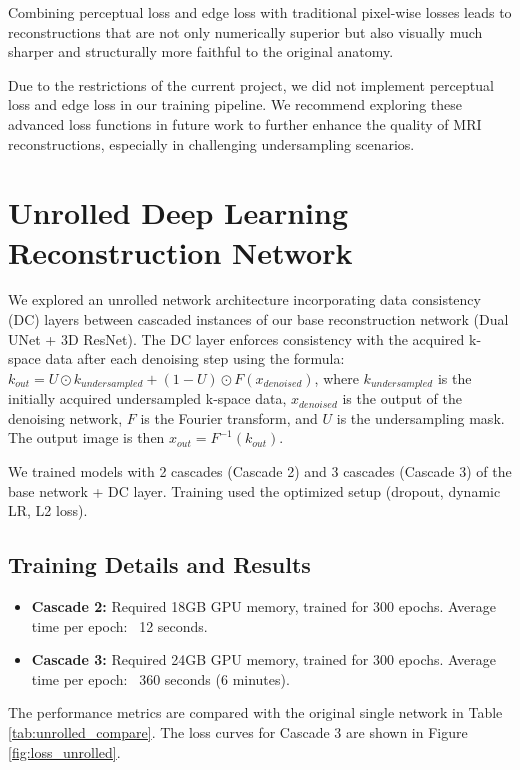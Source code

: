 \documentclass{article}
\begin{document}
Combining perceptual loss and edge loss with traditional pixel-wise losses leads to reconstructions that are not only numerically superior but also visually much sharper and structurally more faithful to the original anatomy.

Due to the restrictions of the current project, we did not implement perceptual loss and edge loss in our training pipeline. We recommend exploring these advanced loss functions in future work to further enhance the quality of MRI reconstructions, especially in challenging undersampling scenarios.



\section{Unrolled Deep Learning Reconstruction Network}
We explored an unrolled network architecture incorporating data consistency (DC) layers between cascaded instances of our base reconstruction network (Dual UNet + 3D ResNet). The DC layer enforces consistency with the acquired k-space data after each denoising step using the formula:
$k_{out} = U \odot k_{undersampled} + (1 - U) \odot F(x_{denoised})$, where $k_{undersampled}$ is the initially acquired undersampled k-space data, $x_{denoised}$ is the output of the denoising network, $F$ is the Fourier transform, and $U$ is the undersampling mask. The output image is then $x_{out} = F^{-1}(k_{out})$.

We trained models with 2 cascades (Cascade 2) and 3 cascades (Cascade 3) of the base network + DC layer. Training used the optimized setup (dropout, dynamic LR, L2 loss).

\subsection{Training Details and Results}
\begin{itemize}
  \item \textbf{Cascade 2:} Required 18GB GPU memory, trained for 300 epochs. Average time per epoch: ~12 seconds.
  \item \textbf{Cascade 3:} Required 24GB GPU memory, trained for 300 epochs. Average time per epoch: ~360 seconds (6 minutes).
\end{itemize}
The performance metrics are compared with the original single network in Table \ref{tab:unrolled_compare}. The loss curves for Cascade 3 are shown in Figure \ref{fig:loss_unrolled}.
\end{document}
